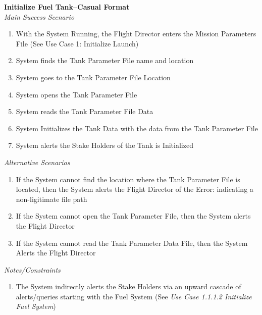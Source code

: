 \documentclass[letterpaper]{article}
\begin{document}
\noindent
\textbf{Initialize Fuel Tank--Casual Format}\\
\textit{Main Success Scenario}
\begin{enumerate}
   \item With the System Running, the Flight Director enters the
      Mission Parameters File (See Use Case 1:  Initialize Launch)
   \item System finds the Tank Parameter File name and location
   \item System goes to the Tank Parameter File Location
   \item System opens the Tank Parameter File
   \item System reads the Tank Parameter File Data
   \item System Initializes the Tank Data with the data from the Tank
      Parameter File
   \item System alerts the Stake Holders of the Tank is Initialized
\end{enumerate}
\textit{Alternative Scenarios}
\begin{enumerate}
   \item[2a, 3a]If the System cannot find the location where the 
      Tank Parameter File is located, then the System alerts the 
      Flight Director of the Error:  indicating a non-ligitimate file
      path
   \item[4a]If the System cannot open the Tank Parameter File, then
      the System alerts the Flight Director
   \item[5a]If the System cannot read the Tank Parameter Data File, then the System Alerts the Flight Director
\end{enumerate}
\textit{Notes/Constraints}
\begin{enumerate}
   \item[7a]The System indirectly alerts the Stake Holders via an 
      upward cascade of alerts/queries starting with the Fuel System
      (See \textit{Use Case 1.1.1.2 Initialize Fuel System})
\end{enumerate}
\end{document}
